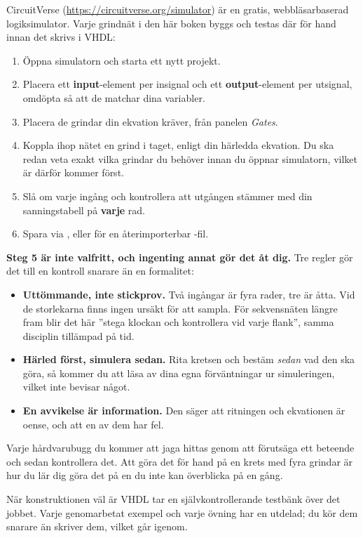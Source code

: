 CircuitVerse (\url{https://circuitverse.org/simulator}) är en gratis, webbläsarbaserad
logiksimulator. Varje grindnät i den här boken byggs och testas där för hand innan det skrivs i
VHDL:
\begin{enumerate}
  \item Öppna simulatorn och starta ett nytt projekt.
  \item Placera ett \textbf{input}-element per insignal och ett \textbf{output}-element per
    utsignal, omdöpta så att de matchar dina variabler.
  \item Placera de grindar din ekvation kräver, från panelen \emph{Gates}.
  \item Koppla ihop nätet en grind i taget, enligt din härledda ekvation. Du ska redan veta exakt
    vilka grindar du behöver innan du öppnar simulatorn, vilket är därför 
    kommer först.
  \item Slå om varje ingång och kontrollera att utgången stämmer med din sanningstabell på
    \textbf{varje} rad.
  \item Spara via , eller 
    för en återimporterbar -fil.
\end{enumerate}

\textbf{Steg 5 är inte valfritt, och ingenting annat gör det åt dig.} Tre regler gör det till en
kontroll snarare än en formalitet:
\begin{itemize}
  \item \textbf{Uttömmande, inte stickprov.} Två ingångar är fyra rader, tre är åtta. Vid de
    storlekarna finns ingen ursäkt för att sampla. För sekvensnäten längre fram blir det här
    ”stega klockan och kontrollera vid varje flank”, samma disciplin tillämpad på tid.
  \item \textbf{Härled först, simulera sedan.} Rita kretsen och bestäm \emph{sedan} vad den ska
    göra, så kommer du att läsa av dina egna förväntningar ur simuleringen, vilket inte bevisar
    något.
  \item \textbf{En avvikelse är information.} Den säger att ritningen och ekvationen är oense, och
    att en av dem har fel.
\end{itemize}

Varje hårdvarubugg du kommer att jaga hittas genom att förutsäga ett beteende och sedan
kontrollera det. Att göra det för hand på en krets med fyra grindar är hur du lär dig göra det på
en du inte kan överblicka på en gång.

När konstruktionen väl är VHDL tar en självkontrollerande testbänk över det jobbet. Varje
genomarbetat exempel och varje övning har en utdelad; du kör dem snarare än skriver dem, vilket
 går igenom.

